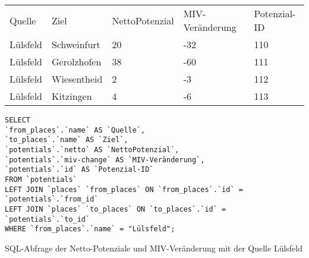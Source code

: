 \begin{tabularx}{\textwidth}{*5{X}}
Quelle & Ziel & NettoPotenzial & MIV-Veränderung & Potenzial-ID\\ 
Lülsfeld & Schweinfurt & 20 & -32 & 110\\ 
Lülsfeld & Gerolzhofen & 38 & -60 & 111\\ 
Lülsfeld & Wiesentheid & 2 & -3 & 112\\ 
Lülsfeld & Kitzingen & 4 & -6 & 113\\ 
\end{tabularx}
\newline
\newline
\begin{listing}[htbp]
\begin{verbatim}
SELECT
`from_places`.`name` AS `Quelle`, 
`to_places`.`name` AS `Ziel`, 
`potentials`.`netto` AS `NettoPotenzial`, 
`potentials`.`miv-change` AS `MIV-Veränderung`, 
`potentials`.`id` AS `Potenzial-ID`
FROM `potentials`
LEFT JOIN `places` `from_places` ON `from_places`.`id` = `potentials`.`from_id`
LEFT JOIN `places` `to_places` ON `to_places`.`id` = `potentials`.`to_id`
WHERE `from_places`.`name` = "Lülsfeld";
\end{verbatim}
\caption{SQL-Abfrage der Netto-Potenziale und MIV-Veränderung mit der Quelle Lülsfeld}\label{lst-fz-luelsfeld}
\end{listing}